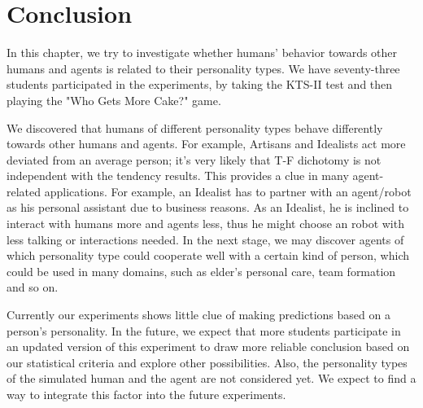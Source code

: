 \section{Conclusion}
\label{ch4:conclusion}
In this chapter, we try to investigate whether humans' behavior towards other humans and agents is related to their personality types. We have seventy-three students participated in the experiments, by taking the KTS-II test and then playing the "Who Gets More Cake?" game. 

We discovered that humans of different personality types behave differently towards other humans and agents. For example, Artisans and Idealists act more deviated from an average person; it's very likely that T-F dichotomy is not independent with the tendency results. This provides a clue in many agent-related applications. For example, an Idealist has to partner
with an agent/robot as his personal assistant due to business
reasons. As an Idealist, he is inclined to interact with humans more and agents less, thus he might choose an robot with less talking
or interactions needed. In the next stage, we may discover agents of which personality type could cooperate well with a certain kind of person, which could be used in many domains, such as elder's personal care, team formation and so on. 

Currently our experiments shows little clue of making predictions based on a person's personality. In the future, we expect that more students participate in an updated version of this experiment to draw more reliable conclusion based on our statistical criteria and explore other possibilities. Also, the personality types of the simulated human and the agent are not considered yet. We expect to find a way to integrate this factor into the future experiments.  
